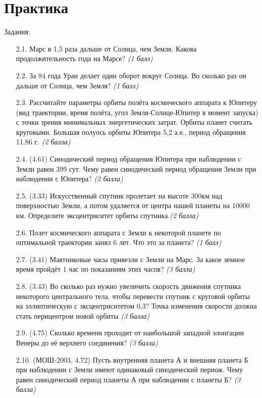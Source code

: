 \documentclass[16pt,a4paper]{report}
\begin{document}
\section{Практика}
Задания:
\begin{enumerate}
    \item [2.1.] Марс в 1,5 раза дальше от Солнца, чем Земля. Какова продолжительность года на Марсе? \emph{(1 балл)}
    \item [2.2.]За 84 года Уран делает один оборот вокруг Солнца. Во сколько раз он дальше от Солнца, чем Земля? \emph{(1 балл)}
    \item [2.3.] Рассчитайте параметры орбиты полёта космического аппарата к Юпитеру (вид траектории, время полёта, угол Земля-Солнце-Юпитер в момент запуска) с точки зрения минимальных энергетических затрат. Орбиты планет считать круговыми. Большая полуось орбиты Юпитера 5,2 а.е., период обращения 11,86 г. \emph{(2 балла)}
    \item [2.4.] (4.61) Синодический период обращения Юпитера при наблюдении с Земли равен 399 сут. Чему равен синодический период обращения Земли при наблюдении с Юпитера? \emph{(2 балла)}
    \item [2.5.] (3.33) Искусственный спутник пролетает на высоте 300км над поверхностью Земли, а потом удаляется от центра нашей планеты на 10000 км. Определите эксцентриситет орбиты спутника.\emph{(2 балла)}
    \item [2.6.] Полет космического аппарата с Земли к некоторой планете по оптимальной траектории занял 6 лет. Что это за планета? \emph{(1 балл)}
    \item [2.7.] (3.41) Маятниковые часы привезли с Земли на Марс. За какое земное время пройдёт 1 час по показаниям этих часов? \emph{(3 балла)}
    \item [2.8.] (3.43) Во сколько раз нужно увеличить скорость движения спутника некоторого центрального тела, чтобы перевести спутник с круговой орбиты на эллиптическую с эксцентриситетом 0,3? Точка изменения скорости должна стать перицентром новой орбиты \emph{(3 балла)}
    \item [2.9.] (4.75) Сколько времени проходит от наибольшой западной элонгации Венеры до её верхнего соединения? \emph{(3 балла)}
    \item[2.10.] (МОШ-2003, 4.72) Пусть внутренняя планета А и внешняя планета Б при наблюдении с Земли имеют одинаковый синодический периож. Чему равен синодический период планеты А при наблюдении с планеты Б? \emph{(3 балла)}
\end{enumerate}
\newpage
\end{document}
